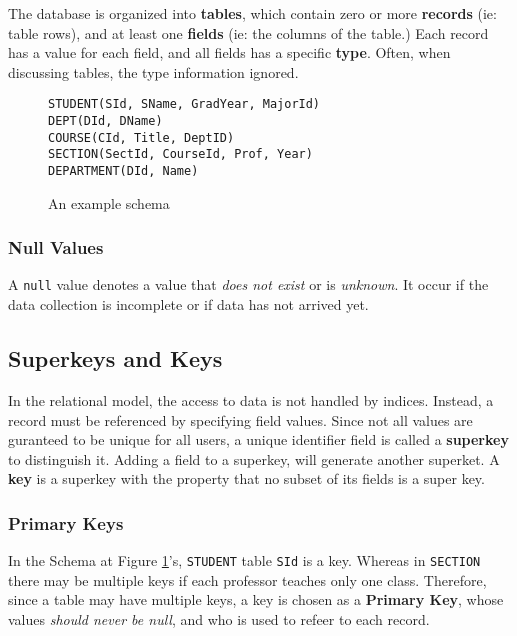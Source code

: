 \documentclass[11pt,a4paper,twocolumn]{book}
\begin{document}
The database is organized into \textbf{tables}, which contain zero or more \textbf{records} (ie: table rows), and at least one \textbf{fields} (ie: the columns of the table.) Each record has a value for each field, and all fields has a specific \textbf{type}. Often, when discussing tables, the type information ignored.

\begin{figure}
\begin{lstlisting}
STUDENT(SId, SName, GradYear, MajorId)
DEPT(DId, DName)
COURSE(CId, Title, DeptID)
SECTION(SectId, CourseId, Prof, Year)
DEPARTMENT(DId, Name)
\end{lstlisting}
\caption{An example schema}
\label{schema:univesity}
\end{figure}

\subsubsection{Null Values}

A \texttt{null} value denotes a value that \textit{does not exist} or is \textit{unknown}. It occur if the data collection is incomplete or if data has not arrived yet.

\subsection{Superkeys and Keys}

In the relational model, the access to data is not handled by indices. Instead, a record must be referenced by specifying field values. Since not all values are guranteed to be unique for all users, a unique identifier field is called a \textbf{superkey} to distinguish it. Adding a field to a superkey, will generate another superket. A \textbf{key} is a superkey with the property that no subset of its fields is a super key.\\

\subsubsection{Primary Keys}

In the Schema at Figure \ref{schema:univesity}'s, \texttt{STUDENT} table \texttt{SId} is a key. Whereas in \texttt{SECTION} there may be multiple keys if each professor teaches only one class. Therefore, since a table may have multiple keys, a key is chosen as a \textbf{Primary Key}, whose  values \textit{should never be null}, and who is used to refeer to each record.\\
\end{document}
